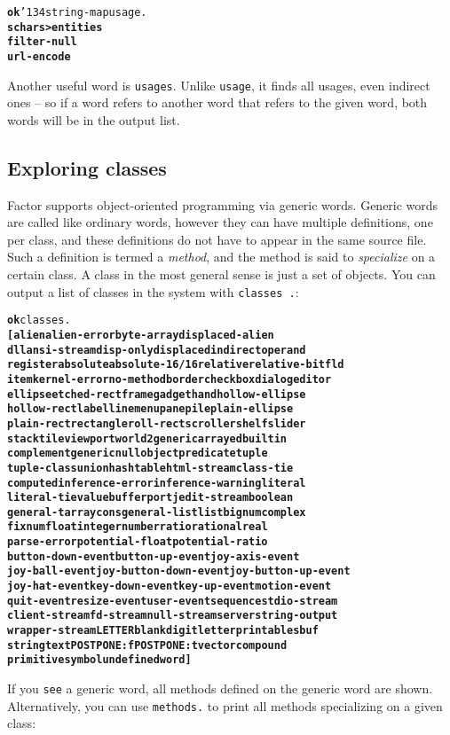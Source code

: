 \documentclass{report}
\newcommand{\bs}{\char'134}
\begin{document}
\begin{alltt}
\textbf{ok} \bs string-map usage .
\textbf{schars>entities
filter-null
url-encode}
\end{alltt}

Another useful word is \texttt{usages}. Unlike \texttt{usage}, it finds all usages, even
indirect ones -- so if a word refers to another word that refers to the given word,
both words will be in the output list.

\subsection{Exploring classes}

Factor supports object-oriented programming via generic words. Generic words are called
like ordinary words, however they can have multiple definitions, one per class, and
these definitions do not have to appear in the same source file. Such a definition is
termed a \emph{method}, and the method is said to \emph{specialize} on a certain
class. A class in the most
general sense is just a set of objects. You can output a list of classes in the system
with \texttt{classes .}:

\begin{alltt}
\textbf{ok} classes.
\textbf{[ alien alien-error byte-array displaced-alien
dll ansi-stream disp-only displaced indirect operand
register absolute absolute-16/16 relative relative-bitfld
item kernel-error no-method border checkbox dialog editor
ellipse etched-rect frame gadget hand hollow-ellipse
hollow-rect label line menu pane pile plain-ellipse
plain-rect rectangle roll-rect scroller shelf slider
stack tile viewport world 2generic arrayed builtin
complement generic null object predicate tuple
tuple-class union hashtable html-stream class-tie
computed inference-error inference-warning literal
literal-tie value buffer port jedit-stream boolean
general-t array cons general-list list bignum complex
fixnum float integer number ratio rational real
parse-error potential-float potential-ratio
button-down-event button-up-event joy-axis-event
joy-ball-event joy-button-down-event joy-button-up-event
joy-hat-event key-down-event key-up-event motion-event
quit-event resize-event user-event sequence stdio-stream
client-stream fd-stream null-stream server string-output
wrapper-stream LETTER blank digit letter printable sbuf
string text POSTPONE: f POSTPONE: t vector compound
primitive symbol undefined word ]}
\end{alltt}

If you \texttt{see} a generic word, all methods defined on the generic word are shown.
Alternatively, you can use \texttt{methods.} to print all methods specializing on a
given class:
\end{document}
